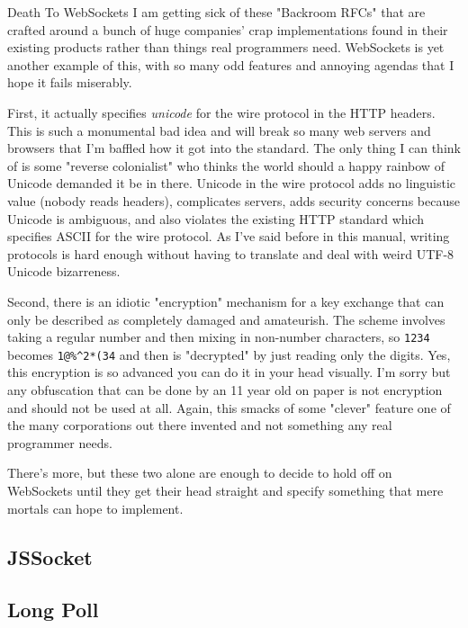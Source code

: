 \begin{aside}{Death To WebSockets}
I am getting sick of these "Backroom RFCs" that are crafted around a bunch of huge
companies' crap implementations found in their existing products rather than things
real programmers need.  WebSockets is yet another example of this, with so many odd
features and annoying agendas that I hope it fails miserably.

First, it actually specifies \emph{unicode} for the wire protocol in the HTTP headers.
This is such a monumental bad idea and will break so many web servers and browsers that
I'm baffled how it got into the standard.  The only thing I can think of is some "reverse colonialist"
who thinks the world should a happy rainbow of Unicode demanded it be in there.  Unicode in
the wire protocol adds no linguistic value (nobody reads headers), complicates servers,
adds security concerns because Unicode is ambiguous, and also violates the existing HTTP standard
which specifies ASCII for the wire protocol.  As I've said before in this manual, writing
protocols is hard enough without having to translate and deal with weird UTF-8 Unicode bizarreness.

Second, there is an idiotic "encryption" mechanism for a key exchange that can only be
described as completely damaged and amateurish.  The scheme involves taking a regular 
number and then mixing in non-number characters, so \verb|1234| becomes \verb|1@%^2*(34| and then is
"decrypted" by just reading only the digits.  Yes, this encryption is so advanced you can do it
in your head visually.  I'm sorry but any obfuscation that can be done by an 11 year old on
paper is not encryption and should not be used at all.  Again, this smacks of some "clever" feature
one of the many corporations out there invented and not something any real programmer needs.

There's more, but these two alone are enough to decide to hold off on WebSockets until
they get their head straight and specify something that mere mortals can hope to implement.
\end{aside}

\subsection{JSSocket}


\subsection{Long Poll}


